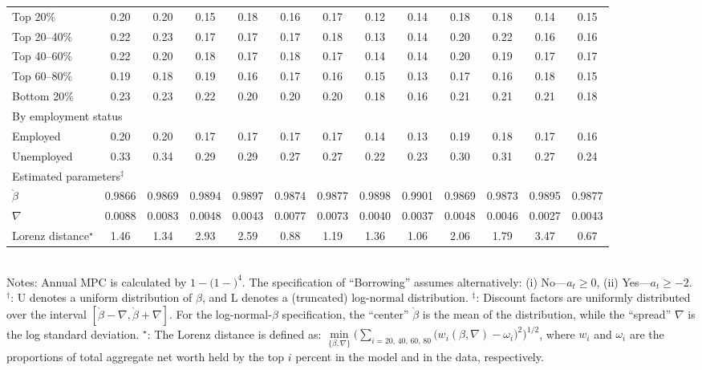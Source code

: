 \begin{sidewaystable}
\begin{tabular}{l c c c c c c c c c c c c}
Top 20\%    & 0.20 & 0.20 & 0.15 & 0.18 & 0.16 & 0.17 & 0.12 & 0.14 & 0.18 & 0.18 & 0.14 & 0.15\\
Top 20--40\% & 0.22 & 0.23 & 0.17 & 0.17 & 0.17 & 0.18 & 0.13 & 0.14 & 0.20 & 0.22 & 0.16 & 0.16\\
Top 40--60\% & 0.22 & 0.20 & 0.18 & 0.17 & 0.18 & 0.17 & 0.14 & 0.14 & 0.20 & 0.19 & 0.17 & 0.17\\
Top 60--80\% & 0.19 & 0.18 & 0.19 & 0.16 & 0.17 & 0.16 & 0.15 & 0.13 & 0.17 & 0.16 & 0.18 & 0.15\\
Bottom 20\% & 0.23 & 0.23 & 0.22 & 0.20 & 0.20 & 0.20 & 0.18 & 0.16 & 0.21 & 0.21 & 0.21 & 0.18\\
\multicolumn{13}{l}{By employment status }\\
Employed    & 0.20 & 0.20 & 0.17 & 0.17 & 0.17 & 0.17 & 0.14 & 0.13 & 0.19 & 0.18 & 0.17 & 0.16\\
Unemployed  & 0.33 & 0.34 & 0.29 & 0.29 & 0.27 & 0.27 & 0.22 & 0.23 & 0.30 & 0.31 & 0.27 & 0.24\\
\midrule
\multicolumn{13}{l}{Estimated parameters${}^\ddagger$ }\\
$\grave{\beta}$ & 0.9866 & 0.9869 & 0.9894 & 0.9897 & 0.9874 & 0.9877 & 0.9898 & 0.9901 & 0.9869 & 0.9873 & 0.9895 & 0.9877\\
$\nabla$ & 0.0088 & 0.0083 & 0.0048 & 0.0043 & 0.0077 & 0.0073 & 0.0040 & 0.0037 & 0.0048 & 0.0046 & 0.0027 & 0.0043\\
\midrule
Lorenz distance${}^\star$ & 1.46 & 1.34 & 2.93 & 2.59 & 0.88 & 1.19 & 1.36 & 1.06 & 2.06 & 1.79 & 3.47 & 0.67\\
\bottomrule
\end{tabular}\\
\footnotesize Notes: Annual MPC is calculated by $1-(1-$$)^{4}$.  The specification of ``Borrowing'' assumes alternatively: (i) No---$a_t\ge0$, (ii) Yes---$a_t\ge-2$. ${}^\dagger$: U denotes a uniform distribution of $\beta$, and L denotes a (truncated) log-normal distribution. ${}^\ddagger$: Discount factors are uniformly distributed over the interval $[\grave{\beta}-\nabla,\grave{\beta}+\nabla]$. For the log-normal-$\beta$ specification,  the ``center'' $\grave{\beta}$ is the mean of the distribution, while the ``spread'' $\nabla$ is the log standard deviation.
${}^\star$: The Lorenz distance is defined as: $\underset{\{{\beta}, \nabla\}}{\min }\Big(\sum_\text{$i=20$, $40$, $60$, $80$}
\big(w_{i}({\beta}, \nabla)-\omega _{i}\big)^{2}\Big)^{1/2}$, where $w_{i}$ and $\omega _{i}$ are the proportions of total aggregate net worth held by the top $i$ percent in the model and in the data, respectively.
\end{sidewaystable}


